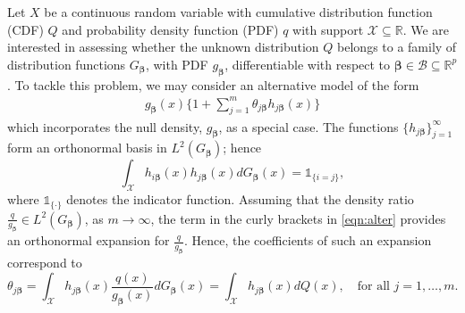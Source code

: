 \documentclass[11pt]{article}
\newcommand{\vect}[1]{\boldsymbol{#1}}
\begin{document}
Let $X$ be a continuous random variable with cumulative distribution function (CDF) $Q$ and probability density function (PDF) $q$
with support $\mathcal{X}\subseteq \mathbb{R}$. We are interested in assessing whether the unknown distribution $Q$ belongs to a family of distribution functions $G_{\vect{\beta}}$, with PDF $g_{\vect{\beta}}$,  differentiable with respect to $\vect{\beta} \in \mathcal{B} \subseteq \mathbb{R}^p$. To tackle this problem, we may consider an alternative model of the form 
\begin{equation}
    \begin{aligned}
 g_{\vect{\beta}}(x)\Big\{1+ \sum_{j=1}^{m} \theta_{j\vect{\beta}} h_{j\vect{\beta}}(x)\Big\}
\label{eqn:alter}
    \end{aligned}
\end{equation}
which incorporates the null density, $g_{\vect{\beta}}$, as a special case. The functions $\{h_{j\vect{\beta}}\}_{j=1}^\infty$ form an orthonormal basis in $ L^2(G_{\vect{\beta}})$; hence 
$$\int_{\mathcal{X}} h_{i\vect{\beta}}(x) h_{j\vect{\beta}}(x) d G_{\vect{\beta}}(x)=\mathds{1}_{\{i=j\}},$$
where $\mathds{1}_{\{\cdot\}}$ denotes the indicator function.
Assuming that the density ratio $\frac{q}{g_{\vect{\beta}}}\in L^2(G_{\vect{\beta}})$, as $m\rightarrow\infty$, the term in the curly brackets in \eqref{eqn:alter} provides an orthonormal expansion for $\frac{q}{g_{\vect{\beta}}}$. Hence, the coefficients 
of such an expansion correspond to $$\theta_{j\vect{\beta}}= \int_{\mathcal{X}} h_{j\vect{\beta}}(x)\frac{q(x)}{g_{\vect{\beta}}(x)} dG_{\vect{\beta}}(x)=\int_{\mathcal{X}} h_{j\vect{\beta}}(x)dQ(x),\quad \text{for all $j=1,\dots,m$}.$$ 
\end{document}

